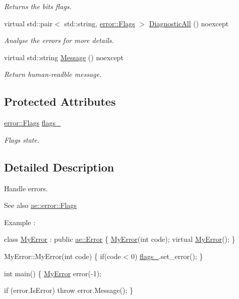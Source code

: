 \begin{DoxyCompactItemize}
\begin{DoxyCompactList}\small\item\em Returns the bits flags. \end{DoxyCompactList}\item 
virtual std\+::pair$<$ std\+::string, \hyperlink{structae_1_1error_1_1_flags}{error\+::\+Flags} $>$ \hyperlink{classae_1_1_error_ab6172fe7f6627dd726223bd4bd923693}{Diagnostic\+All} () noexcept
\begin{DoxyCompactList}\small\item\em Analyse the errors for more details. \end{DoxyCompactList}\item 
virtual std\+::string \hyperlink{classae_1_1_error_a5390c80f9eed13d8b4fce01468395187}{Message} () noexcept
\begin{DoxyCompactList}\small\item\em Return human-\/readble message. \end{DoxyCompactList}\end{DoxyCompactItemize}
\subsection*{Protected Attributes}
\begin{DoxyCompactItemize}
\item 
\hyperlink{structae_1_1error_1_1_flags}{error\+::\+Flags} \hyperlink{classae_1_1_error_a323912fc2d0f697f2513d0c990478073}{flags\+\_\+}
\begin{DoxyCompactList}\small\item\em Flags state. \end{DoxyCompactList}\end{DoxyCompactItemize}


\subsection{Detailed Description}
Handle errors. 

\begin{DoxySeeAlso}{See also}
\hyperlink{structae_1_1error_1_1_flags}{ae\+::error\+::\+Flags}
\end{DoxySeeAlso}
Example \+: 
\begin{DoxyCode}
\textcolor{keyword}{class }\hyperlink{class_my_error}{MyError} : \textcolor{keyword}{public} \hyperlink{classae_1_1_error}{ae::Error} \{
    \hyperlink{class_my_error}{MyError}(\textcolor{keywordtype}{int} code);
    \textcolor{keyword}{virtual} \hyperlink{class_my_error}{MyError}();
\}

MyError::MyError(\textcolor{keywordtype}{int} code) \{
    \textcolor{keywordflow}{if}(code < 0)
        \hyperlink{classae_1_1_error_a323912fc2d0f697f2513d0c990478073}{flags\_}.set\_error();
\}

\textcolor{keywordtype}{int} main() \{
    \hyperlink{class_my_error}{MyError} error(-1);

    \textcolor{keywordflow}{if} (error.IsError) \textcolor{keywordflow}{throw} error.Message();
\}
\end{DoxyCode}
 

